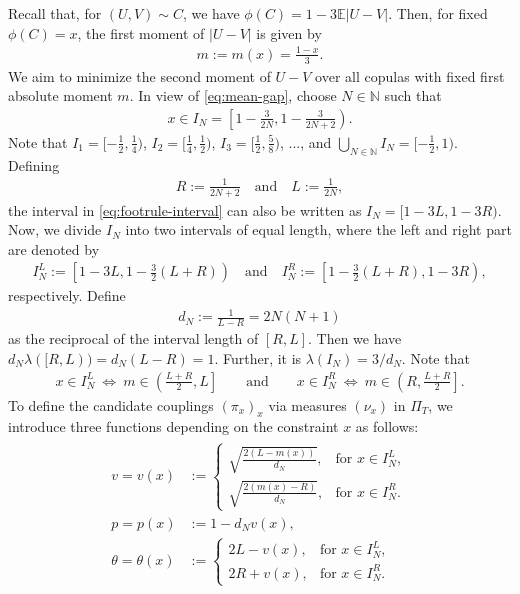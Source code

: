 \documentclass{article}
\newcommand{\lam}{\lambda}
\newcommand{\E}{\mathbb{E}}
\newcommand{\N}{\mathbb{N}}
\begin{document}
Recall that, for \((U,V)\sim C\), we have \(\phi(C) = 1 - 3 \E|U-V|\).
Then, for fixed \(\phi(C) = x\), the first moment of \(|U-V|\) is given by
\begin{align}\label{eq:mean-gap}
    m := m(x) = \frac{1-x}{3}.
\end{align}
We aim to minimize the second moment of \(U-V\) over all copulas with fixed first absolute moment \(m\).
In view of \eqref{eq:mean-gap}, choose \(N\in \N\) such that
\begin{align}\label{eq:footrule-interval}
    x\in I_N = \left[1-\frac{3}{2N}, 1-\frac{3}{2N+2}\right).
\end{align}
Note that \(I_1 = [-\frac 1 2 ,\frac 1 4)\), \(I_2 = [\frac 1 4 , \frac 1 2)\), \(I_3 = [\frac 1 2, \frac 5 8)\), ..., and \(\bigcup_{N\in \N} I_N = [-\frac 1 2 , 1)\).
Defining
\begin{align}\label{def:RL}
    R :=\frac{1}{2N+2} \quad \text{and} \quad L := \frac{1}{2N},
\end{align}
the interval in \eqref{eq:footrule-interval} can also be written as \(I_N = [1-3L,1-3R)\).
Now, we divide \(I_N\) into two intervals of equal length, where the left and right part are denoted by
\begin{align}\label{def:I_NL-I_NR}
    I_N^L:= \left[ 1-3L, 1-\frac 3 2 (L+R)\right) \quad \text{and} \quad I_N^R:= \left[1-\frac 3 2 (L+R), 1-3R\right),
\end{align}
respectively.
Define
\begin{align}\label{eq:dN}
    d_N := \frac{1}{L-R} = 2N(N+1)    
\end{align}
as the reciprocal of the interval length of \([R,L]\).
Then we have \(d_N \lam([R,L)) = d_N(L-R) = 1\).
Further, it is \(\lam(I_N) = 3/d_N\).
Note that
\begin{align*}
    x\in I_N^L ~ \Longleftrightarrow ~ m\in \left(\frac{L+R}{2},L\right]\qquad\text{and}\qquad
    x\in I_N^R ~ \Longleftrightarrow ~ m\in \left(R,\frac{L+R}{2}\right].
\end{align*}
To define the candidate couplings \((\pi_x)_x\) via measures \((\nu_x)\) in \(\Pi_T\), we introduce three functions depending on the constraint \(x\) as follows:
\begin{align}\label{def:vptheta}
\begin{split}
    v = v(x) &:= \begin{cases}
        \sqrt{\frac {2 (L-m(x))}{d_N}} , &\text{for } x\in I_N^L,\\
        \sqrt{\frac {2 (m(x)-R)}{d_N}} , &\text{for } x\in I_N^R.
    \end{cases}\\
    p = p(x) &:= 1-d_N v(x),\\
    \theta = \theta(x) &:= \begin{cases}
        2L - v(x), &\text{for } x\in I_N^L,\\
        2R + v(x), &\text{for } x\in I_N^R.
    \end{cases}
\end{split}
\end{align}
\end{document}
